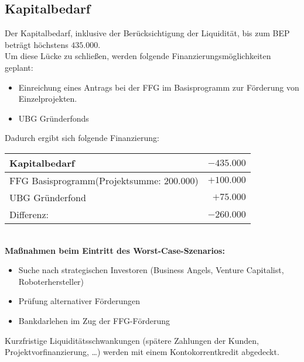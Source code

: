 \subsection{Kapitalbedarf}
Der Kapitalbedarf, inklusive der Berücksichtigung der Liquidität, bis zum BEP beträgt höchstens $435.000$\officialeuro.\\
Um diese Lücke zu schließen, werden folgende Finanzierungsmöglichkeiten geplant:
\begin{itemize}
	\item Einreichung eines Antrags bei der FFG im Basisprogramm zur Förderung von Einzelprojekten.
	\item UBG Gründerfonds
\end{itemize}
Dadurch ergibt sich folgende Finanzierung:\\
\begin{tabular}{l r}
	Kapitalbedarf & $-435.000$\officialeuro \\
	\hline
	FFG Basisprogramm(Projektsumme: $200.000$\officialeuro) & $+100.000$\officialeuro \\
	UBG Gründerfond & $+75.000$\officialeuro \\
	\bottomrule
	Differenz: & $-260.000$\officialeuro
\end{tabular}\\

\textbf{Maßnahmen beim Eintritt des Worst-Case-Szenarios:}
\begin{itemize}
	\item Suche nach strategischen Investoren (Business Angels, Venture Capitalist, Roboterhersteller)
	\item Prüfung alternativer Förderungen
	\item Bankdarlehen im Zug der FFG-Förderung
\end{itemize}
Kurzfristige Liquiditätsschwankungen (spätere Zahlungen der Kunden, Projektvorfinanzierung, …) werden mit einem Kontokorrentkredit abgedeckt.